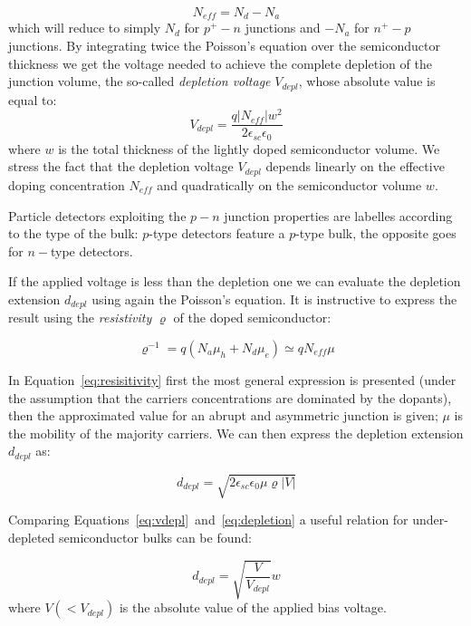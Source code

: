 \begin{equation}
N_{eff} = N_d-N_a
\label{eq:Neff}
\end{equation}
which will reduce to simply $N_d$ for $p^+-n$ junctions and $-N_a$ for $n^+-p$ junctions.
By integrating twice the Poisson's equation over the semiconductor thickness we get 
the voltage needed to achieve the complete depletion of the 
junction volume, the so-called {\it depletion voltage} $V_{depl}$, whose absolute value is equal to:
\begin{equation}
V_{depl}=\dfrac{q|N_{eff}|w^2}{2\epsilon_{sc}\epsilon_0}
\label{eq:vdepl}
\end{equation} 
 where $w$ is the total thickness of the lightly doped semiconductor volume. We stress 
 the fact that the depletion voltage $V_{depl}$ depends linearly on the effective doping 
 concentration $N_{eff}$ and quadratically on the semiconductor volume $w$.

Particle detectors exploiting the $p-n$ junction properties are labelles according to the type 
of the bulk: $p$-type detectors feature a $p$-type bulk, the opposite goes for $n-$type detectors.

If the applied voltage is less than the depletion one we can evaluate the depletion extension 
$d_{depl}$
using again the Poisson's equation. It is instructive to express the result using the {\it resistivity} 
$\varrho$ of the doped semiconductor:

\begin{equation}
\varrho^{-1}=q(N_a\mu_h+N_d\mu_e)\simeq qN_{eff}\mu
\label{eq:resisitivity}
\end{equation}

In Equation~\ref{eq:resisitivity} first the most general expression is presented (under the assumption 
that the carriers concentrations are dominated by the dopants), then the approximated value for an 
abrupt and asymmetric junction is given; $\mu$ is the mobility of the majority carriers.
We can then express the depletion extension $d_{depl}$ as:

\begin{equation}
d_{depl} = \sqrt{2\epsilon_{sc}\epsilon_{0}\mu\varrho|V|}
\label{eq:depletion}
\end{equation}

Comparing Equations~\ref{eq:vdepl}~and~\ref{eq:depletion} a useful relation for under-depleted 
semiconductor bulks can be found:

\begin{equation}
d_{depl} = \sqrt{\dfrac{V}{V_{depl}}}w
\label{eq:dunderdepleted}
\end{equation}
where $V(<V_{depl})$ is the absolute value of the applied bias voltage.

